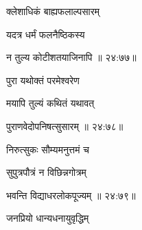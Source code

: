 \nemslokab

{\devanagarifont क्लेशाधिकं बाह्यफलाल्पसारम्  \danda\dontdisplaylinenum }%
 
\nemslokac

{\devanagarifont यदत्र धर्मं फलनैष्ठिकस्य }%
  \dontdisplaylinenum    {}%



\nemslokad

{\devanagarifont न तुल्य कोटीशतयाजिनापि {॥ २४:७७॥} \veg\dontdisplaylinenum }%
 
\ujvers{}

\nemslokab

{\devanagarifont पुरा यथोक्तं परमेश्वरेण  \danda\dontdisplaylinenum }%
 
\nemslokac

{\devanagarifont मयापि तुल्यं कथितं यथावत् }%
  \dontdisplaylinenum


\nemslokad

{\devanagarifont पुराणवेदोपनिषत्सुसारम् {॥ २४:७८॥} \veg\dontdisplaylinenum }%
 
\ujvers{}    %


\nemslokab

{\devanagarifont निरुत्सुकः सौम्यमनुत्तमं च  \danda\dontdisplaylinenum }%

\nemslokac

{\devanagarifont सुपुत्रपौत्रं न विछिन्नगोत्रम् }%
  \dontdisplaylinenum


\nemslokad

{\devanagarifont भवन्ति विद्याधरलोकपूज्यम् {॥ २४:७९॥} \veg\dontdisplaylinenum }%
 
\ujvers{}    %


\nemslokab

{\devanagarifont जनप्रियो धान्यधनायुवृद्धिम्  \danda\dontdisplaylinenum }%

\nemslokac

